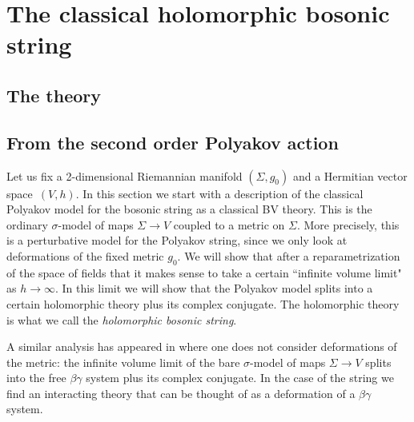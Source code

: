 \section{The classical holomorphic bosonic string}


\subsection{The theory} 

\subsection{From the second order Polyakov action}

Let us fix a 2-dimensional Riemannian manifold $(\Sigma, g_0)$ and a Hermitian vector space~$(V,h)$. In this section we start with a description of the classical Polyakov model for the bosonic string as a classical BV theory. This is the ordinary $\sigma$-model of maps $\Sigma \to V$ coupled to a metric on $\Sigma$. More precisely, this is a perturbative model for the Polyakov string, since we only look at deformations of the fixed metric $g_0$. We will show that after a reparametrization of the space of fields that it makes sense to take a certain ``infinite volume limit" as $h \to \infty$. In this limit we will show that the Polyakov model splits into a certain holomorphic theory plus its complex conjugate. The holomorphic theory is what we call the {\em holomorphic bosonic string}.

\begin{rmk} A similar analysis has appeared in \cite{GGW} where one does not consider deformations of the metric: the infinite volume limit of the bare $\sigma$-model of maps $\Sigma \to V$ splits into the free $\beta\gamma$ system plus its complex conjugate. In the case of the string we find an interacting theory that can be thought of as a deformation of a $\beta\gamma$ system. 
\end{rmk}


